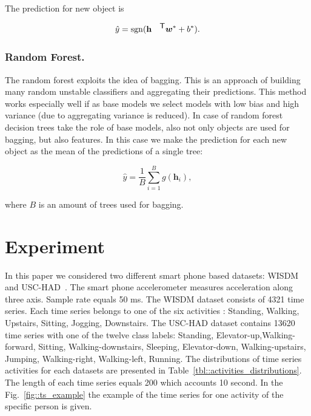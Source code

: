 \documentclass{llncs}
\DeclareMathOperator{\sgn}{\mathop{sgn}}
\newcommand{\T}{{\mbox{\footnotesize\sffamily\upshape\mdseries T}}}
\begin{document}
The prediction for new object is

\begin{equation*}
\hat{y} = \sgn (\mathbf{h}^{\T} \bm{w}^* + b^*).
\end{equation*}

\subsubsection{Random Forest.}
The random forest exploits the idea of bagging. This is an approach of building many random unstable classifiers and aggregating their predictions. This method works especially well if as base models we select models with low bias and high variance (due to aggregating variance is reduced). In case of random forest decision trees take the role of base models, also not only objects are used for bagging, but also features. In this case we make the prediction for each new object as the mean of the predictions of a single tree:

\begin{equation*}
\hat{y} = \frac{1}{B} \sum_{i=1}^{B} g(\mathbf{h}_i),
\end{equation*}

where $B$ is an amount of trees used for bagging.

\section{Experiment}
In this paper we considered two different smart phone based datasets: WISDM~\cite{wisdm} and USC-HAD~\cite{usc}. 
The smart phone accelerometer measures acceleration along three axis. 
Sample rate equals 50 ms. 
The WISDM dataset consists of 4321 time series. Each time series belongs to one of the six activities : Standing, Walking, Upstairs, Sitting, Jogging, Downstairs. The USC-HAD dataset contains 13620 time series with one of the twelve class labels: Standing, Elevator-up,Walking-forward, Sitting, Walking-downstairs, Sleeping, Elevator-down, Walking-upstairs, Jumping, Walking-right, Walking-left, Running.
The distributions of time series activities for each datasets are presented in Table~\ref{tbl::activities_distributions}. 
The length of each time series equals 200 which accounts 10 second. 
In the Fig.~\ref{fig::ts_example} the example of the time series for one activity of the specific person is given.
\end{document}
